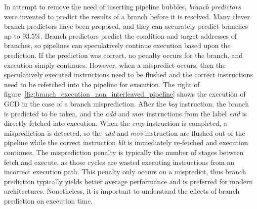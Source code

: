 In attempt to remove the need of inserting pipeline bubbles, \emph{branch predictors} were invented to predict the results of a branch before it is resolved.
Many clever branch predictors have been proposed, and they can accurately predict branches up to 93.5\%.
Branch predictors predict the condition and target addresses of branches, so pipelines can speculatively continue execution based upon the prediction.  
If the prediction was correct, no penalty occurs for the branch, and execution simply continues. 
However, when a mispredict occurs, then the speculatively executed instructions need to be flushed and the correct instructions need to be refetched into the pipeline for execution.
The right of figure~\ref{fig:branch_execution_non_interleaved_pipeline} shows the execution of GCD in the case of a branch misprediction.
After the \emph{beq} instruction, the branch is predicted to be taken, and the \emph{add} and \emph{mov} instructions from the label \emph{end} is directly fetched into execution. 
When the \emph{cmp} instruction is completed, a misprediction is detected, so the \emph{add} and \emph{mov} instruction are flushed out of the pipeline while the correct instruction \emph{blt} is immediately re-fetched and execution continues.
The misprediction penalty is typically the number of stages between fetch and execute, as those cycles are wasted executing instructions from an incorrect execution path.
This penalty only occurs on a mispredict, thus branch prediction typically yields better average performance and is preferred for modern architectures.
Nonetheless, it is important to understand the effects of branch prediction on execution time. 

